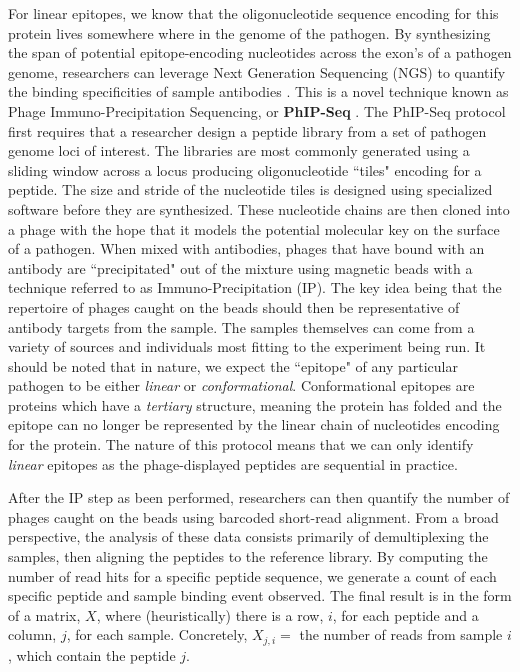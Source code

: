 \documentclass{article}
\begin{document}
For linear epitopes, we know that the oligonucleotide sequence encoding for this protein lives somewhere where in the genome of the pathogen.
By synthesizing the span of potential epitope-encoding nucleotides across the exon's of a pathogen genome,
researchers can leverage Next Generation Sequencing (NGS) to quantify the binding specificities of sample antibodies \cite{Jody2010, Khan2020}. 
This is a novel technique known as Phage Immuno-Precipitation Sequencing, or \textbf{PhIP-Seq} \cite{Larman2011}.
The PhIP-Seq protocol first requires that a researcher design a peptide library from a set of pathogen genome loci of interest.
The libraries are most commonly generated using a sliding window across a locus producing oligonucleotide ``tiles" encoding for a peptide.
The size and stride of the nucleotide tiles is designed using specialized software before they are synthesized.
These nucleotide chains are then cloned into a phage with the hope that it models the potential molecular key on the surface of a pathogen. 
When mixed with antibodies, phages that have bound with an antibody are ``precipitated" out of the mixture using magnetic beads with a technique referred to as Immuno-Precipitation (IP).
The key idea being that the repertoire of phages caught on the beads should then be representative of antibody targets from the sample.
The samples themselves can come from a variety of sources and individuals most fitting to the experiment being run. 
It should be noted that in nature, we expect the ``epitope" of any particular pathogen to be either \textit{linear} or \textit{conformational}.
Conformational epitopes are proteins which have a \textit{tertiary} structure, meaning the protein has folded and the epitope can no longer be represented by the linear chain of nucleotides encoding for the protein.
The nature of this protocol means that we can only identify \textit{linear} epitopes as the phage-displayed peptides are sequential in practice.

After the IP step as been performed,
researchers can then quantify the number of phages caught on the beads using barcoded short-read alignment. 
From a broad perspective, the analysis of these data consists primarily of demultiplexing the samples,
then aligning the peptides to the reference library.
By computing the number of read hits for a specific peptide sequence, we generate a count of each specific peptide and sample binding event observed. 
The final result is in the form of a matrix, $X$, where (heuristically) there is a row, $i$, for each peptide and a column, $j$, for each sample.
Concretely, $X_{j,i} =$ the number of reads from sample $i$, which contain the peptide $j$.
\end{document}
